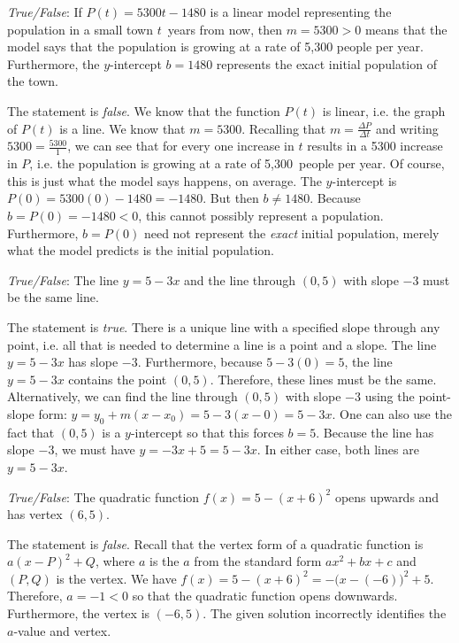 \documentclass[11pt,letterpaper]{article}
\begin{document}
\quizsol \textit{True/False}: If $P(t)= 5300t - 1480$ is a linear model representing the population in a small town $t$~years from now, then $m= 5300 > 0$ means that the model says that the population is growing at a rate of 5,300 people per year. Furthermore, the $y$-intercept $b= 1480$ represents the exact initial population of the town. \pspace

\sol The statement is \textit{false}. We know that the function $P(t)$ is linear, i.e. the graph of $P(t)$ is a line. We know that $m= 5300$. Recalling that $m= \frac{\Delta P}{\Delta t}$ and writing $5300= \frac{5300}{1}$, we can see that for every one increase in $t$ results in a 5300 increase in $P$, i.e. the population is growing at a rate of 5,300~people per year. Of course, this is just what the model says happens, on average. The $y$-intercept is $P(0)= 5300(0) - 1480= -1480$. But then $b \neq 1480$. Because $b= P(0)= -1480 < 0$, this cannot possibly represent a population. Furthermore, $b= P(0)$ need not represent the \textit{exact} initial population, merely what the model predicts is the initial population. \pvspace{1.3cm}



\quizsol \textit{True/False}: The line $y= 5 - 3x$ and the line through $(0, 5)$ with slope $-3$ must be the same line. \pspace

\sol The statement is \textit{true}. There is a unique line with a specified slope through any point, i.e. all that is needed to determine a line is a point and a slope. The line $y= 5 - 3x$ has slope $-3$. Furthermore, because $5 - 3(0)= 5$, the line $y= 5 - 3x$ contains the point $(0, 5)$. Therefore, these lines must be the same. Alternatively, we can find the line through $(0, 5)$ with slope $-3$ using the point-slope form: $y= y_0 + m(x - x_0)= 5 - 3(x - 0)= 5 - 3x$. One can also use the fact that $(0, 5)$ is a $y$-intercept so that this forces $b= 5$. Because the line has slope $-3$, we must have $y= -3x + 5= 5 - 3x$. In either case, both lines are $y= 5 - 3x$. \pvspace{1.3cm}



\quizsol \textit{True/False}: The quadratic function $f(x)= 5 - (x + 6)^2$ opens upwards and has vertex $(6, 5)$. \pspace

\sol The statement is \textit{false}. Recall that the vertex form of a quadratic function is $a(x - P)^2 + Q$, where $a$ is the $a$ from the standard form $ax^2 + bx + c$ and $(P, Q)$ is the vertex. We have $f(x)= 5 - (x + 6)^2= -\big(x - (-6) \big)^2 + 5$. Therefore, $a= -1 < 0$ so that the quadratic function opens downwards. Furthermore, the vertex is $(-6, 5)$. The given solution incorrectly identifies the $a$-value and vertex. \pvspace{1.3cm}
\end{document}
